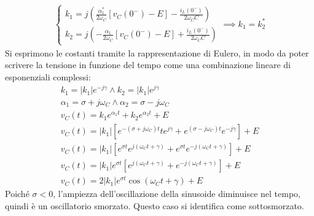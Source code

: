 \documentclass{article}
\numberwithin{equation}{subsection}
\begin{document}
\begin{gather*}
    \begin{cases}
        k_1=j\left(\displaystyle\frac{\alpha_1^*}{2\omega_C}[v_C(0^-)-E]-\frac{i_L(0^-)}{2\omega_CC}\right)\\
        k_2=j\left(\displaystyle-\frac{\alpha_1}{2\omega_C}[v_C(0^-)-E]+\frac{i_L(0^-)}{2\omega_CC}\right)
    \end{cases}\implies k_1=k_2^*
\end{gather*}
Si esprimono le costanti tramite la rappresentazione di Eulero, in modo da poter scrivere la tensione in funzione del tempo come una combinazione lineare di esponenziali 
complessi:
\begin{gather*}
    k_1=|k_1|e^{-j\gamma}\land k_2=|k_1|e^{j\gamma}\\
    \alpha_1=\sigma+j\omega_C\land \alpha_2=\sigma-j\omega_C\\
    v_C(t)=k_1e^{\alpha_1t}+k_2e^{\alpha_2t}+E\\
    v_C(t)=|k_1|\left[e^{-(\sigma+j\omega_C)t}te^{j\gamma}+e^{(\sigma-j\omega_C)t}e^{-j\gamma}\right]+E\\
    v_C(t)=|k_1|\left[e^{\sigma t}e^{j(\omega_Ct+\gamma)}+e^{\sigma t}e^{-j(\omega_Ct+\gamma)}\right]+E\\
    v_C(t)=|k_1|e^{\sigma t}\left[e^{j(\omega_Ct+\gamma)}+e^{-j(\omega_Ct+\gamma)}\right]+E\\
    v_C(t)=2|k_1|e^{\sigma t}\cos(\omega_Ct+\gamma)+E
\end{gather*}
Poiché $\sigma<0$, l'ampiezza dell'oscillazione della sinusoide diminuisce nel tempo, quindi è un oscillatorio smorzato. Questo caso si identifica come sottosmorzato. 
\end{document}
